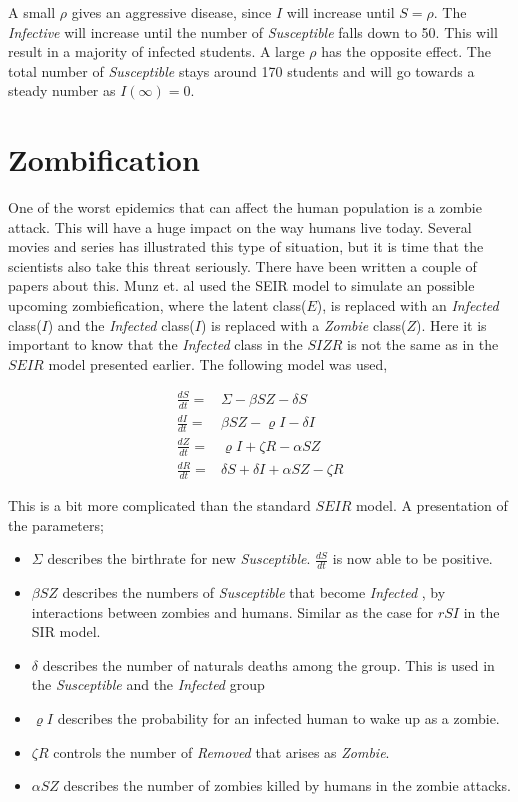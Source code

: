 \documentclass[%
twoside,                 %
final,                   %
10pt]{article}
\begin{document}
A small $\rho$ gives an aggressive disease, since $I$ will increase until $S= \rho$. The \emph{Infective} will increase until the number of \emph{Susceptible} falls down to 50. This will result in a majority of infected students. A large $\rho$ has the opposite effect. The total number of \emph{Susceptible} stays around 170 students and will go towards a steady number as $I(\infty)=0$.   

\section{Zombification}
One of the worst epidemics that can affect the human population is a zombie attack. This will have a huge impact on the way humans live today. Several movies and series has illustrated this type of situation, but it is time that the scientists also take this threat seriously. There have been written a couple of papers about this. Munz et. al\cite{munz2009zombies} used the SEIR model to simulate an possible upcoming zombiefication, where the latent class($E$), is replaced with an \emph{Infected} class($I$) and the \emph{Infected} class($I$) is replaced with a \emph{Zombie} class($Z$). Here it is important to know that the \emph{Infected} class in the $SIZR$ is not the same as in the $SEIR$ model presented earlier. The following model was used,

\begin{align*}
\frac{dS}{dt} =& \Sigma -\beta SZ - \delta S \\
\frac{dI}{dt} =& \beta SZ - \varrho I - \delta I\\
\frac{dZ}{dt} =& \varrho I + \zeta R - \alpha SZ\\
\frac{dR}{dt} =& \delta S + \delta I + \alpha SZ - \zeta R
\end{align*}

This is a bit more complicated than the standard $SEIR$ model. A presentation of the parameters;
\begin{itemize}
\item $\Sigma$ describes the birthrate for new \emph{Susceptible}. $\frac{dS}{dt}$ is now able to be positive. 

\item $\beta SZ$ describes the numbers of \emph{Susceptible} that become \emph{Infected} , by interactions between zombies and humans. Similar as the case for $rSI$ in the SIR model. 

\item $\delta$ describes the number of naturals deaths among the group. This is used in the \emph{Susceptible} and the \emph{Infected} group

\item $\varrho I$ describes the probability for an infected human to wake up as a zombie.

\item $\zeta R$ controls the number of \emph{Removed} that arises as \emph{Zombie}. 

\item $\alpha SZ$ describes the number of zombies killed by humans in the zombie attacks. 
\end{itemize}
\end{document}
